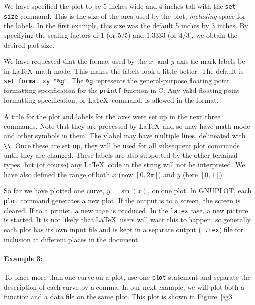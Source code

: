 
We have specified the plot to be 5 inches wide and 4 inches tall with
the {\tt set size} command. This is the size of the area used by the
plot, {\em including} space for the labels.  In the first example,
this size was the default 5 inches by 3 inches. By specifying the
scaling factors of 1 (or 5/5) and 1.3333 (or 4/3), we obtain the
desired plot size. 

We have requested that the format used by the $x$- and $y$-axis tic
mark labels be in \LaTeX\ math mode. This makes the labels look a
little better. The default is \verb+set format xy "%g"+. The \verb+%g+
represents the general-purpose floating point formatting specification
for the {\tt printf} function in C. Any valid floating-point
formatting specification, or \LaTeX\ command, is allowed in the
format.

A title for the plot and labels for the axes were set up in the next
three commands.  Note that they are processed by \LaTeX\ and so may
have math mode and other symbols in them. The ylabel may have multiple
lines, delineated with \verb+\\+.  Once these are set up, they will be
used for all subsequent plot commands until they are changed. These
labels are also supported by the other terminal types, but (of course)
any \LaTeX\ code in the string will not be interpreted. We have also
defined the range of both $x$ (now $[0,2\pi]$) and $y$ (here $[0,1]$).

So far we have plotted one curve, $y=\sin(x)$, on one plot. In
GNUPLOT, each {\tt plot} command generates a new plot. If the output
is to a screen, the screen is cleared. If to a printer, a new page is
produced. In the {\tt latex} case, a new picture is started. It is not
likely that \LaTeX\ users will want this to happen, so generally each
plot has its own input file and is kept in a separate output ({\tt
.tex}) file for inclusion at different places in the document.

\paragraph{Example 3:} To place more than one curve on a plot, use one
{\tt plot} statement and separate the description of each curve by a
comma. In our next example, we will plot both a function and a data
file on the same plot. This plot is shown in Figure~\ref{eg3}.

